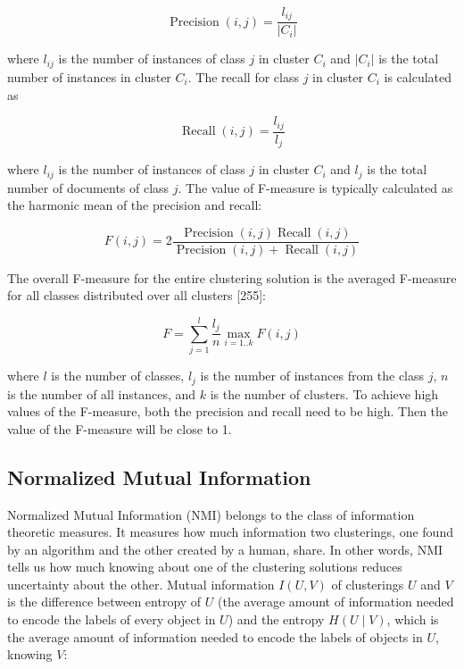 \documentclass[11pt,openany,executivepaper]{book}
\begin{document}
\begin{equation}
\operatorname{Precision}(i, j)=\frac{l_{i j}}{\left|C_{i}\right|}
\end{equation}

where $l_{i j}$ is the number of instances of class $j$ in cluster $C_{i}$ and $\left|C_{i}\right|$ is the total number of instances in cluster $C_{i}$. The recall for class $j$ in cluster $C_{i}$ is calculated as

\begin{equation}
\operatorname{Recall}(i, j)=\frac{l_{i j}}{l_{j}}
\end{equation}

where $l_{i j}$ is the number of instances of class $j$ in cluster $C_{i}$ and $l_{j}$ is the total number of documents of class $j$. The value of F-measure is typically calculated as the harmonic mean of the precision and recall:

\begin{equation}
F(i, j)=2 \frac{\operatorname{Precision}(i, j) \operatorname{Recall}(i, j)}{\operatorname{Precision}(i, j)+\operatorname{Recall}(i, j)}
\end{equation}

The overall F-measure for the entire clustering solution is the averaged F-measure for all classes distributed over all clusters [255]:

\begin{equation}
F=\sum_{j=1}^{l} \frac{l_{j}}{n} \max_{i=1..k} F(i, j)
\end{equation}

where $l$ is the number of classes, $l_{j}$ is the number of instances from the class $j$, $n$ is the number of all instances, and $k$ is the number of clusters. To achieve high values of the F-measure, both the precision and recall need to be high. Then the value of the F-measure will be close to 1.

\subsection*{Normalized Mutual Information}
Normalized Mutual Information (NMI) belongs to the class of information theoretic measures. It measures how much information two clusterings, one found by an algorithm and the other created by a human, share. In other words, NMI tells us how much knowing about one of the clustering solutions reduces uncertainty about the other. Mutual information $I(U, V)$ of clusterings $U$ and $V$ is the difference between entropy of $U$ (the average amount of information needed to encode the labels of every object in $U$) and the entropy $H(U \mid V)$, which is the average amount of information needed to encode the labels of objects in $U$, knowing $V$:
\end{document}
